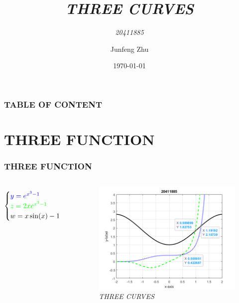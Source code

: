 \documentclass[11pt]{beamer}
\title{\textit{THREE CURVES}}
\subtitle{\textit{20411885}}
\author{Junfeng Zhu}
\institute{UNNC}
\date{\today}
\begin{document}
\begin{frame}\label{TP}
\titlepage
\end{frame}

\begin{frame}\frametitle{TABLE OF CONTENT}\label{TOC}
\tableofcontents
\end{frame}

\section{THREE FUNCTION}
\begin{frame}\frametitle{THREE FUNCTION}\label{TF}
\begin{columns}

\begin{eqnarray*} 
\begin{cases}

\textcolor{blue}{y =  e^{x^3-1}}\\
\textcolor{green}{z =  2x\*e^{x^3-1}}\\
w =  x\*\sin(x)-1

\end{cases}
\end{eqnarray*}

\pause

\begin{figure}
\centering
\includegraphics[scale=0.45]{threecurves}
\caption{\textit{THREE CURVES}}
\end{figure}
\end{columns}
\end{frame}
\end{document}
